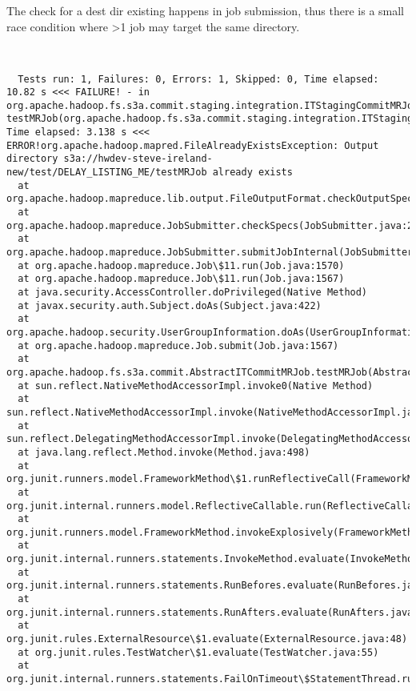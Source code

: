 \documentclass[11pt]{article}
\begin{document}
The check for a dest dir existing happens in job submission, thus there is a
small race condition where >1 job may target the same directory.

\begin{verbatim}


  Tests run: 1, Failures: 0, Errors: 1, Skipped: 0, Time elapsed: 10.82 s <<< FAILURE! - in org.apache.hadoop.fs.s3a.commit.staging.integration.ITStagingCommitMRJobBadDest[ERROR] testMRJob(org.apache.hadoop.fs.s3a.commit.staging.integration.ITStagingCommitMRJobBadDest)  Time elapsed: 3.138 s <<< ERROR!org.apache.hadoop.mapred.FileAlreadyExistsException: Output directory s3a://hwdev-steve-ireland-new/test/DELAY_LISTING_ME/testMRJob already exists
  at org.apache.hadoop.mapreduce.lib.output.FileOutputFormat.checkOutputSpecs(FileOutputFormat.java:164)
  at org.apache.hadoop.mapreduce.JobSubmitter.checkSpecs(JobSubmitter.java:280)
  at org.apache.hadoop.mapreduce.JobSubmitter.submitJobInternal(JobSubmitter.java:146)
  at org.apache.hadoop.mapreduce.Job\$11.run(Job.java:1570)
  at org.apache.hadoop.mapreduce.Job\$11.run(Job.java:1567)
  at java.security.AccessController.doPrivileged(Native Method)
  at javax.security.auth.Subject.doAs(Subject.java:422)
  at org.apache.hadoop.security.UserGroupInformation.doAs(UserGroupInformation.java:1965)
  at org.apache.hadoop.mapreduce.Job.submit(Job.java:1567)
  at org.apache.hadoop.fs.s3a.commit.AbstractITCommitMRJob.testMRJob(AbstractITCommitMRJob.java:206)
  at sun.reflect.NativeMethodAccessorImpl.invoke0(Native Method)
  at sun.reflect.NativeMethodAccessorImpl.invoke(NativeMethodAccessorImpl.java:62)
  at sun.reflect.DelegatingMethodAccessorImpl.invoke(DelegatingMethodAccessorImpl.java:43)
  at java.lang.reflect.Method.invoke(Method.java:498)
  at org.junit.runners.model.FrameworkMethod\$1.runReflectiveCall(FrameworkMethod.java:47)
  at org.junit.internal.runners.model.ReflectiveCallable.run(ReflectiveCallable.java:12)
  at org.junit.runners.model.FrameworkMethod.invokeExplosively(FrameworkMethod.java:44)
  at org.junit.internal.runners.statements.InvokeMethod.evaluate(InvokeMethod.java:17)
  at org.junit.internal.runners.statements.RunBefores.evaluate(RunBefores.java:26)
  at org.junit.internal.runners.statements.RunAfters.evaluate(RunAfters.java:27)
  at org.junit.rules.ExternalResource\$1.evaluate(ExternalResource.java:48)
  at org.junit.rules.TestWatcher\$1.evaluate(TestWatcher.java:55)
  at org.junit.internal.runners.statements.FailOnTimeout\$StatementThread.run(FailOnTimeout.java:74)

\end{verbatim}
\end{document}
